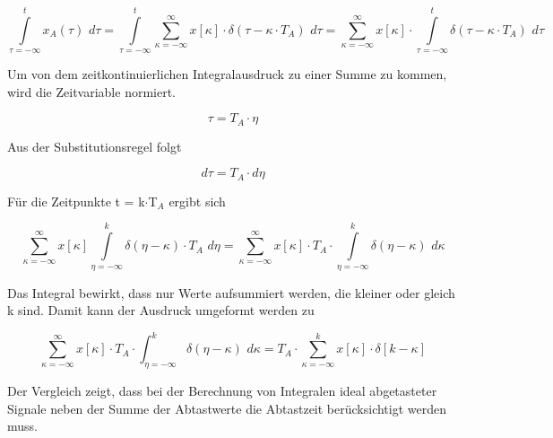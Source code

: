 \begin{equation}\label{eq:threetwentyeight}
\int\limits _{\tau =-\infty }^{t}x_{A} \left(\tau \right)\, \, d\tau  =\int\limits _{\tau =-\infty }^{t}\sum _{\kappa =-\infty }^{\infty }x\left[\kappa \right]\cdot \delta \left(\tau -\kappa \cdot T_{A} \right) \, \, d\tau  =\sum _{\kappa =-\infty }^{\infty }x\left[\kappa \right]\cdot \int\limits _{\tau =-\infty }^{t}\delta \left(\tau -\kappa \cdot T_{A} \right)\, \, d\tau 
\end{equation}

\noindent Um von dem zeitkontinuierlichen Integralausdruck zu einer Summe zu kommen, wird die Zeitvariable normiert.

\begin{equation}\label{eq:threetwentynine}
\tau =T_{A} \cdot \eta 
\end{equation}

\noindent Aus der Substitutionsregel folgt 

\begin{equation}\label{eq:threethirty}
d\tau =T_{A} \cdot d\eta 
\end{equation}

\noindent F\"{u}r die Zeitpunkte t = k$\cdot$T${}_{A}$ ergibt sich 

\begin{equation}\label{eq:threethirtyone}
\sum _{\kappa =-\infty }^{\infty }x\left[\kappa \right]\int\limits _{\eta =-\infty }^{k}\delta \left(\eta -\kappa \right)\cdot T_{A} \, \, d\eta   =\sum _{\kappa =-\infty }^{\infty }x\left[\kappa \right]\cdot T_{A} \cdot \int\limits _{\eta =-\infty }^{k}\delta \left(\eta -\kappa \right)\, \, d\kappa  
\end{equation}

\noindent Das Integral bewirkt, dass nur Werte aufsummiert werden, die kleiner oder gleich k sind. Damit kann der Ausdruck umgeformt werden zu

\begin{equation}\label{eq:threethirtytwo}
\sum _{\kappa =-\infty }^{\infty }x\left[\kappa \right]\cdot T_{A} \cdot \int _{\eta =-\infty }^{k}\delta \left(\eta -\kappa \right)\, \, d\kappa   =T_{A} \cdot \sum _{\kappa =-\infty }^{k}x\left[\kappa \right]\cdot \delta \left[k-\kappa \right]
\end{equation}

\noindent Der Vergleich zeigt, dass bei der Berechnung von Integralen ideal abgetasteter Signale neben der Summe der Abtastwerte die Abtastzeit ber\"{u}cksichtigt werden muss. 

